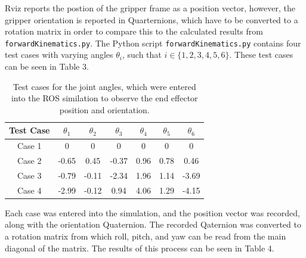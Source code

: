\documentclass[a4paper]{article}
\begin{document}
Rviz reports the postion of the gripper frame as a position vector, however, the gripper orientation is reported in Quarternions, which have to be converted to a rotation matrix in order to compare this to the calculated results from \verb|forwardKinematics.py|. The Python script \verb|forwardKinematics.py| contains four test cases with varying angles $\theta_i$, such that $i \in \{1,2,3,4,5,6\}$. These test cases can be seen in Table 3.

\begin{table}[h]
	\centering
	\caption{Test cases for the joint angles, which were entered into the ROS similation to observe the end effector position and orientation.}
	\begin{tabular}{ccccccc}
		\toprule
		\textbf{Test Case} & $\theta_1$ & $\theta_2$ & $\theta_3$ & $\theta_4$ & $\theta_5$ & $\theta_6$\\
		\midrule
		Case 1 & 0 & 0 & 0 & 0 & 0 & 0\\
		Case 2 & -0.65 & 0.45 & -0.37 & 0.96 & 0.78 & 0.46\\
		Case 3 & -0.79 & -0.11 & -2.34 & 1.96 & 1.14 & -3.69\\
		Case 4 & -2.99 & -0.12 & 0.94 & 4.06 & 1.29 & -4.15\\
		\bottomrule
	\end{tabular}
\end{table}

Each case was entered into the simulation, and the position vector was recorded, along with the orientation Quaternion. The recorded Qaternion was converted to a rotation matrix from which roll, pitch, and yaw can be read from the main diagonal of the matrix. The results of this process can be seen in Table 4.
\end{document}
